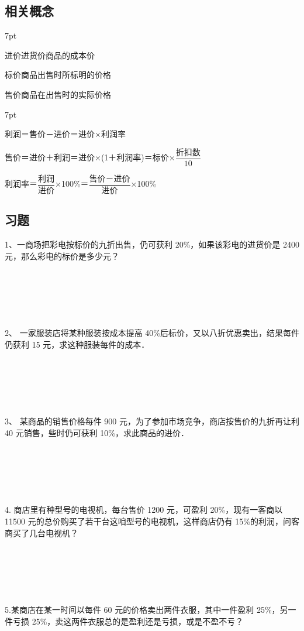 \documentclass{article}
\newenvironment{wa}{%
\def\FrameCommand{%
\hspace{1pt}%
{\color{LightCoral}\vrule width 2pt}%
{\color{washade}\vrule width 4pt}%
\colorbox{washade}%
}%
\MakeFramed{\advance\hsize-\width\FrameRestore}%
\noindent\hspace{-4.55pt}%
\begin{adjustwidth}{}{7pt}%
\vspace{2pt}\vspace{2pt}%
\normalfont %
}
{%
\vspace{2pt}\end{adjustwidth}\endMakeFramed%
}
\begin{document}
\subsection{相关概念}
\begin{wa}
    \quad \quad 进价进货价商品的成本价

    标价商品出售时所标明的价格

    售价商品在出售时的实际价格
\end{wa}
\begin{wa}
    \quad \quad 利润＝售价－进价＝进价×利润率

    售价＝进价＋利润＝进价×(1＋利润率)＝标价×$\dfrac{\text{折扣数}}{10}$

    利润率＝$\dfrac{\text{利润}}{\text{进价}}$×100\%＝$\dfrac{\text{售价－进价}}{\text{进价}}$×100\%
\end{wa}
\subsection{习题}
1、一商场把彩电按标价的九折出售，仍可获利 20\%，如果该彩电的进货价是 2400 元，那么彩电的标价是多少元？

~\\
~\\
~\\
~\\
~\\
2、 一家服装店将某种服装按成本提高 40\%后标价，又以八折优惠卖出，结果每件仍获利 15 元，求这种服装每件的成本．

~\\
~\\
~\\
~\\
~\\
3、 某商品的销售价格每件 900 元，为了参加市场竞争，商店按售价的九折再让利 40 元销售，些时仍可获利 10\%，求此商品的进价．

~\\
~\\
~\\
~\\
~\\
4. 商店里有种型号的电视机，每台售价 1200 元，可盈利 20\%，现有一客商以 11500 元的总价购买了若干台这咱型号的电视机，这样商店仍有 15\%的利润，问客商买了几台电视机？

~\\
~\\
~\\
~\\
~\\
5.某商店在某一时间以每件 60 元的价格卖出两件衣服，其中一件盈利 25\%，另一件亏损 25\%，卖这两件衣服总的是盈利还是亏损，或是不盈不亏？
\end{document}
